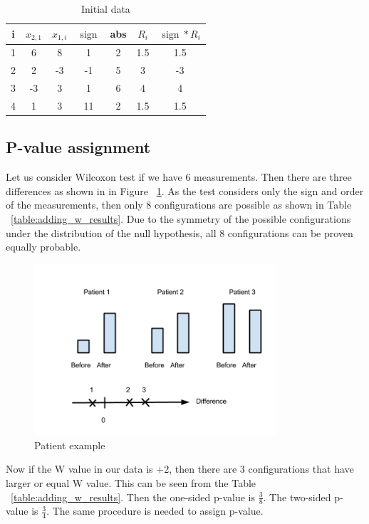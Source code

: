 \documentclass[12pt]{article}
\DeclareMathOperator{\sign}{sign}
\begin{document}
{\begin{table}[h!]
  \begin{center}
    \begin{tabular}{ccccccc}
      \hline
      i & $x_{2, 1}$ & $x_{1, i}$ & $\sign$ & abs & $R_i$ & $\sign * R_i$\\
      \hline
      1 & 6 & 8 & 1 & 2 & 1.5 & 1.5 \\
      \hline
      2 & 2 & -3 & -1 & 5 & 3 & -3 \\
      \hline
      3 & -3 & 3 & 1 & 6 & 4 & 4 \\
      \hline
      4 & 1 & 3 & 11 & 2 & 1.5 & 1.5 \\
      \hline
    \end{tabular}
    \caption{Initial data}
    \label{table:wilx_example}
  \end{center}
\end{table}


\subsection{P-value assignment}
Let us consider Wilcoxon test if we have 6 measurements. Then there are three differences as shown in in Figure ~\ref{fig:patientExample}. As the test considers only the sign and order of the measurements, then only 8 configurations are possible as shown in Table ~\ref{table:adding_w_results}. Due to the symmetry of the possible configurations under the distribution of the null hypothesis, all 8 configurations can be proven equally probable.
\begin{figure}[h!]
  \centering
  \includegraphics[width=0.8\textwidth]{patientExample}
  \caption{Patient example}
  \label{fig:patientExample}
\end{figure}

Now if the W value in our data is $+2$, then there are 3 configurations that have larger or equal W value. This can be seen from the Table ~\ref{table:adding_w_results}. Then the one-sided p-value is $\frac{3}{8}$. The two-sided p-value is $\frac{3}{4}$. The same procedure is needed to assign p-value.

}
\end{document}
